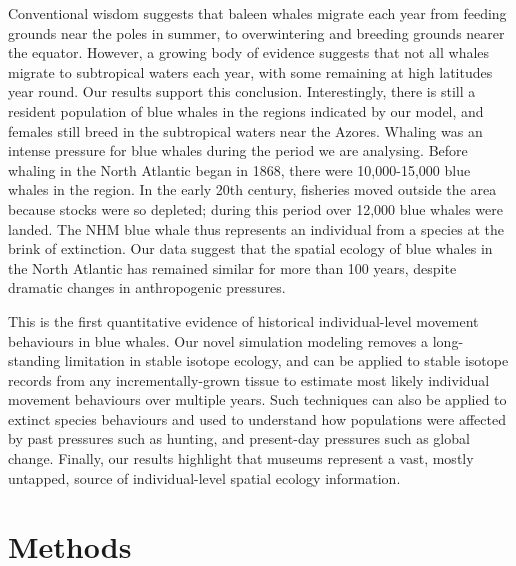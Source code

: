\documentclass[a4paper,12pt]{article}
\begin{document}
Conventional wisdom suggests that baleen whales migrate each year from feeding grounds near the poles in summer, to overwintering and breeding grounds nearer the equator\cite{corkeron1999baleen,lockyer1981migration}. 
However, a growing body of evidence suggests that not all whales migrate to subtropical waters each year, with some remaining at high latitudes year round\cite{mcdonald2006biogeographic}. %
Our results support this conclusion. 
Interestingly, there is still a resident%
 population of blue whales in the regions indicated by our model, and females still breed in the subtropical waters near the Azores\cite{reilly2008balaenoptera}. 
Whaling was an intense pressure for blue whales during the period we are analysing. 
Before whaling in the North Atlantic began in 1868\cite{reilly2008balaenoptera}, there were 10,000-15,000 blue whales in the region\cite{sigurjonsson1995life}. 
In the early 20th century, fisheries moved outside the area because stocks were so depleted\cite{reilly2008balaenoptera}; during this period over 12,000 blue whales were landed\cite{sigurjonsson1995life}. 
The NHM blue whale thus represents an individual from a species at the brink of extinction.
Our data suggest that the spatial ecology of blue whales in the North Atlantic has remained similar for more than 100 years, despite dramatic changes in anthropogenic pressures. %

This is the first quantitative evidence of historical individual-level movement behaviours in blue whales. %
Our novel simulation modeling removes a long-standing limitation in stable isotope ecology, and can be applied to stable isotope records from any incrementally-grown tissue to estimate most likely individual movement behaviours over multiple years. 
Such techniques can also be applied to extinct species behaviours and used to understand how populations were affected by past pressures such as hunting, and present-day pressures such as global change. 
Finally, our results highlight that museums represent a vast, mostly untapped, source of individual-level spatial ecology information. %

\section{Methods}
\end{document}
